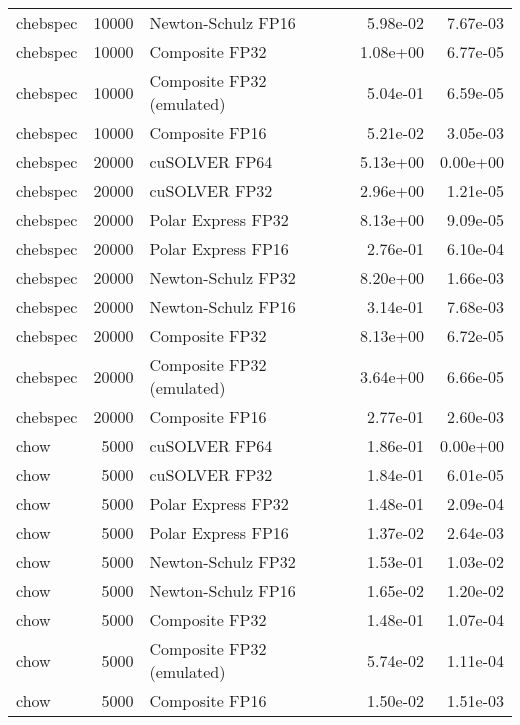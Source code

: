 \begin{table}
\begin{tabular}{lrlrr}
 chebspec & 10000 &        Newton-Schulz FP16 &  5.98e-02 &        7.67e-03 \\
 chebspec & 10000 &            Composite FP32 &  1.08e+00 &        6.77e-05 \\
 chebspec & 10000 & Composite FP32 (emulated) &  5.04e-01 &        6.59e-05 \\
 chebspec & 10000 &            Composite FP16 &  5.21e-02 &        3.05e-03 \\
 chebspec & 20000 &             cuSOLVER FP64 &  5.13e+00 &        0.00e+00 \\
 chebspec & 20000 &             cuSOLVER FP32 &  2.96e+00 &        1.21e-05 \\
 chebspec & 20000 &        Polar Express FP32 &  8.13e+00 &        9.09e-05 \\
 chebspec & 20000 &        Polar Express FP16 &  2.76e-01 &        6.10e-04 \\
 chebspec & 20000 &        Newton-Schulz FP32 &  8.20e+00 &        1.66e-03 \\
 chebspec & 20000 &        Newton-Schulz FP16 &  3.14e-01 &        7.68e-03 \\
 chebspec & 20000 &            Composite FP32 &  8.13e+00 &        6.72e-05 \\
 chebspec & 20000 & Composite FP32 (emulated) &  3.64e+00 &        6.66e-05 \\
 chebspec & 20000 &            Composite FP16 &  2.77e-01 &        2.60e-03 \\
     chow &  5000 &             cuSOLVER FP64 &  1.86e-01 &        0.00e+00 \\
     chow &  5000 &             cuSOLVER FP32 &  1.84e-01 &        6.01e-05 \\
     chow &  5000 &        Polar Express FP32 &  1.48e-01 &        2.09e-04 \\
     chow &  5000 &        Polar Express FP16 &  1.37e-02 &        2.64e-03 \\
     chow &  5000 &        Newton-Schulz FP32 &  1.53e-01 &        1.03e-02 \\
     chow &  5000 &        Newton-Schulz FP16 &  1.65e-02 &        1.20e-02 \\
     chow &  5000 &            Composite FP32 &  1.48e-01 &        1.07e-04 \\
     chow &  5000 & Composite FP32 (emulated) &  5.74e-02 &        1.11e-04 \\
     chow &  5000 &            Composite FP16 &  1.50e-02 &        1.51e-03 \\

\end{tabular}
\end{table}
